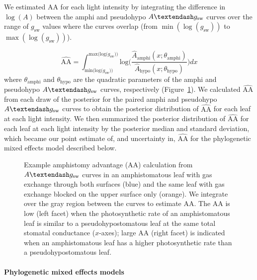 \documentclass[
  letterpaper,
  DIV=11,
  numbers=noendperiod]{scrartcl}
\let\oldparagraph\paragraph
\renewcommand{\paragraph}[1]{\oldparagraph{#1}\mbox{}}
\newcommand{\aax}{$\mathrm{AA}$}
\newcommand{\agcurve}{$A \textendash g_\text{sw}$}
\newcommand{\gsw}{$g_\text{sw}$}
\newcommand{\logA}{$\log(A)$}
\begin{document}
We estimated \aax{} for each light intensity by integrating the
difference in \logA{} between the amphi and pseudohypo \agcurve{} curves
over the range of \gsw{} values where the curves overlap (from
\(\min(\log(g_\text{sw}))\) to \(\max(\log(g_\text{sw}))\)).

\[\widehat{\mathrm{AA}} = \int_{\text{min(log(}g_\text{sw}))}^{\text{max(log(}g_\text{sw}))} \text{log}\bigg(\frac{\hat{A}_\text{amphi}(x; \theta_{\text{amphi}})}{\hat{A}_\text{hypo}(x; \theta_{\text{hypo}})}\bigg) dx\]
where \(\theta_\text{amphi}\) and \(\theta_\text{hypo}\) are the
quadratic parameters of the amphi and pseudohypo \agcurve{} curves,
respectively (Figure~\ref{fig-example-aa}). We calculated
\(\widehat{\mathrm{AA}}\) from each draw of the posterior for the paired
amphi and pseudohypo \agcurve{} curves to obtain the posterior
distribution of \(\widehat{\mathrm{AA}}\) for each leaf at each light
intensity. We then summarized the posterior distribution of
\(\widehat{\mathrm{AA}}\) for each leaf at each light intensity by the
posterior median and standard deviation, which became our point estimate
of, and uncertainty in, \(\widehat{\mathrm{AA}}\) for the phylogenetic
mixed effects model described below.

\begin{figure}


\caption{\label{fig-example-aa}Example amphistomy advantage (\aax)
calculation from \agcurve{} curves in an amphistomatous leaf with gas
exchange through both surfaces (blue) and the same leaf with gas
exchange blocked on the upper surface only (orange). We integrate over
the gray region between the curves to estimate \aax{}. The \aax{} is low
(left facet) when the photosynthetic rate of an amphistomatous leaf is
similar to a pseudohypostomatous leaf at the same total stomatal
conductance (\(x\)-axes); large \aax{} (right facet) is indicated when
an amphistomatous leaf has a higher photosynthetic rate than a
pseudohypostomatous leaf.}

\end{figure}%

\paragraph{Phylogenetic mixed effects models}\label{sec-phylo}
\end{document}
